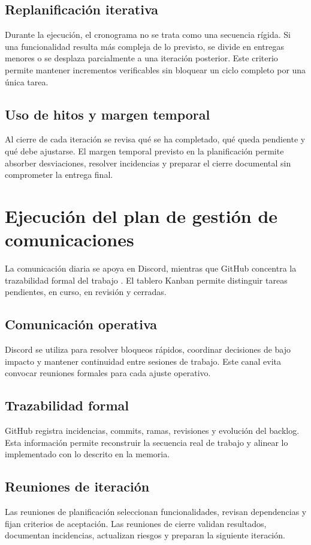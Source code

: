 \subsection{Replanificación iterativa}
Durante la ejecución, el cronograma no se trata como una secuencia rígida. Si una
funcionalidad resulta más compleja de lo previsto, se divide en entregas menores o se
desplaza parcialmente a una iteración posterior. Este criterio permite mantener incrementos
verificables sin bloquear un ciclo completo por una única tarea.

\subsection{Uso de hitos y margen temporal}
Al cierre de cada iteración se revisa qué se ha completado, qué queda pendiente y qué debe
ajustarse. El margen temporal previsto en la planificación permite absorber desviaciones,
resolver incidencias y preparar el cierre documental sin comprometer la entrega final.

\section{Ejecución del plan de gestión de comunicaciones}
La comunicación diaria se apoya en Discord, mientras que GitHub concentra la trazabilidad
formal del trabajo \cite{githubIssuesProjects}. El tablero Kanban permite distinguir tareas
pendientes, en curso, en revisión y cerradas.

\subsection{Comunicación operativa}
Discord se utiliza para resolver bloqueos rápidos, coordinar decisiones de bajo impacto y
mantener continuidad entre sesiones de trabajo. Este canal evita convocar reuniones formales
para cada ajuste operativo.

\subsection{Trazabilidad formal}
GitHub registra incidencias, commits, ramas, revisiones y evolución del backlog. Esta
información permite reconstruir la secuencia real de trabajo y alinear lo implementado con
lo descrito en la memoria.

\subsection{Reuniones de iteración}
Las reuniones de planificación seleccionan funcionalidades, revisan dependencias y fijan
criterios de aceptación. Las reuniones de cierre validan resultados, documentan incidencias,
actualizan riesgos y preparan la siguiente iteración.

